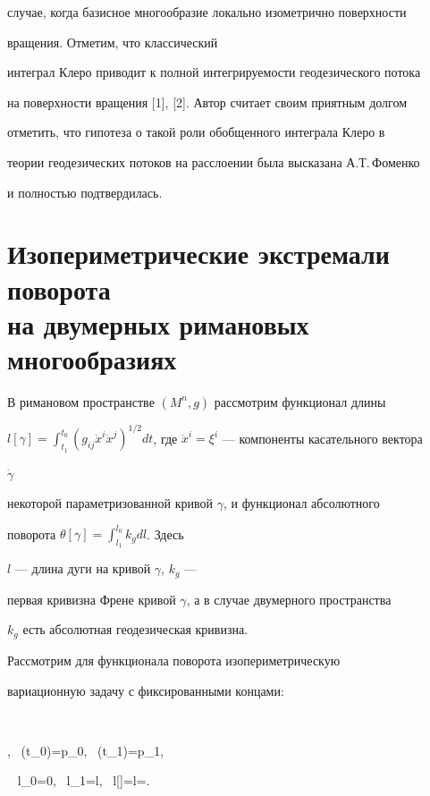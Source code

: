 случае, когда базисное многообразие локально изометрично поверхности 


вращения. Отметим, что классический 


интеграл Клеро приводит к полной интегрируемости геодезического потока 


на поверхности вращения [1], [2]. Автор считает своим приятным долгом 


отметить, что гипотеза о такой роли обобщенного интеграла Клеро в 


теории геодезических потоков на расслоении была высказана А.Т.\,Фоменко 


и полностью подтвердилась. 


 


\section{Изопериметрические экстремали поворота\protect\\


на двумерных римановых многообразиях} 


 


В римановом пространстве $(M^n,g)$ рассмотрим функционал длины 


$l[\gamma]=\displaystyle\int^{t_0}_{t_1}(g_{i j}\Dot x^i\Dot 


x^j)^{1/2}dt$, где $\Dot x^i=\xi^i$ --- компоненты касательного вектора 


$\Dot\gamma$ 


некоторой параметризованной кривой $\gamma$, и функционал абсолютного 


поворота $\theta[\gamma]=\displaystyle\int^{l_0}_{l_1}k_g dl$. Здесь 


$l$ --- длина дуги на кривой $\gamma$, $k_g$ ---


первая кривизна Френе кривой $\gamma$, а в случае двумерного пространства


$k_g$ есть абсолютная геодезическая кривизна. 


 


Рассмотрим для функционала поворота изопериметрическую 


вариационную задачу с фиксированными концами: 


$$ 


\delta{},\ \; \gamma(t_0)=p_0,\ \; \gamma(t_1)=p_1, 


\ \; l_0=0,\ \; l_1=\wh l,\ \; l[\gamma]=\wh l=\const. 


